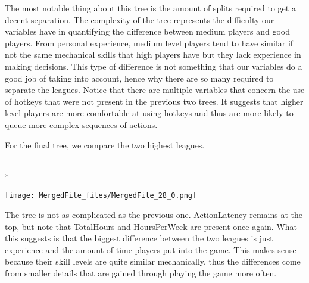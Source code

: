 \documentclass[letterpaper,10pt,english]{/usr/share/sphinx/texinputs/sphinxhowto}
\def\smaller{\fontsize{9.5pt}{9.5pt}\selectfont}
\newenvironment{InvisibleVerbatim}
        {\begin{mdframed}[leftmargin=0.1\linewidth,innerleftmargin=3pt,innerrightmargin=3pt, userdefinedwidth=1\linewidth, linewidth=0pt, linecolor=white, usetwoside=false]}
        {\end{mdframed}}
\begin{document}
        
    
The most notable thing about this tree is the amount of splits required
to get a decent separation. The complexity of the tree represents the
difficulty our variables have in quantifying the difference between
medium players and good players. From personal experience, medium level
players tend to have similar if not the same mechanical skills that high
players have but they lack experience in making decisions. This type of
difference is not something that our variables do a good job of taking
into account, hence why there are so many required to separate the
leagues. Notice that there are multiple variables that concern the use
of hotkeys that were not present in the previous two trees. It suggests
that higher level players are more comfortable at using hotkeys and thus
are more likely to queue more complex sequences of actions.

For the final tree, we compare the two highest leagues.

    

        
        

            
                \makebox[0.1\linewidth]{\smaller\hfill\tt\color{nbframe-out-prompt}Out\hspace{4pt}{[}20{]}:\hspace{4pt}}\\*
                \vspace{-2.55\baselineskip}\begin{InvisibleVerbatim}
                \vspace{-0.5\baselineskip}
    \begin{center}
    \texttt{[image: MergedFile\_files/MergedFile\_28\_0.png]}
    \par
    \end{center}
    
            \end{InvisibleVerbatim}
            
        
    
The tree is not as complicated as the previous one. ActionLatency
remains at the top, but note that TotalHours and HoursPerWeek are
present once again. What this suggests is that the biggest difference
between the two leagues is just experience and the amount of time
players put into the game. This makes sense because their skill levels
are quite similar mechanically, thus the differences come from smaller
details that are gained through playing the game more often.
\end{document}
